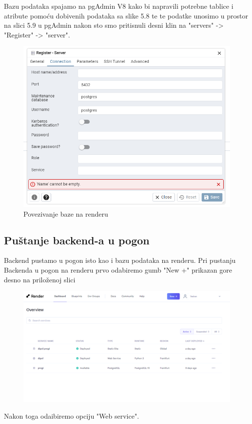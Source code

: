 				\text{}Bazu podataka spajamo na pgAdmin V8 kako bi napravili potrebne tablice i atribute pomoću dobivenih podataka sa slike 5.8 te te podatke unosimo u prostor na slici 5.9 u pgAdmin nakon sto smo pritisnuli desni klin na "servers" -> "Register" -> "server".
				\newpage
				\begin{figure}[htb]
					\centering
					\includegraphics[width=15cm]{slike/server.png}
					\caption{Povezivanje baze na renderu}
					\label{fig:fer-logo}
				\end{figure}
				
			\subsection{Puštanje backend-a u pogon}
			
				\text{} Backend pustamo u pogon isto kao i bazu podataka na renderu. Pri pustanju Backenda u pogon na renderu prvo odabiremo gumb "New +" prikazan gore desno na priloženoj slici\\
			
			
				\begin{figure}[htb]
					\centering
					\includegraphics[width=15cm]{slike/back_1.png}
					\label{fig:fer-logo}
				\end{figure}
				\newpage
				\text{}Nakon toga odaibiremo opciju "Web service".\\
				
